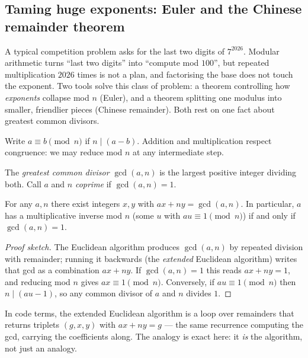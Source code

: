 
\subsection{Taming huge exponents: Euler and the Chinese remainder theorem}

A typical competition problem asks for the last two digits of $7^{2026}$.
Modular arithmetic turns ``last two digits'' into ``compute mod $100$'',
but repeated multiplication $2026$ times is not a plan, and factorising the
base does not touch the exponent. Two tools solve this class of problem:
a theorem controlling how \emph{exponents} collapse mod $n$ (Euler), and a
theorem splitting one modulus into smaller, friendlier pieces (Chinese
remainder). Both rest on one fact about greatest common divisors.

\begin{definition}
Write $a \equiv b \pmod{n}$ if $n \mid (a-b)$. Addition and multiplication
respect congruence: we may reduce mod $n$ at any intermediate step.

The \emph{greatest common divisor} $\gcd(a,n)$ is the largest positive
integer dividing both. Call $a$ and $n$ \emph{coprime} if $\gcd(a,n)=1$.
\end{definition}

\begin{theorem}\label{thm:bezout}
For any $a,n$ there exist integers $x,y$ with $ax+ny=\gcd(a,n)$.
In particular, $a$ has a multiplicative inverse mod $n$ (some $u$ with
$au \equiv 1 \pmod{n}$) if and only if $\gcd(a,n)=1$.
\end{theorem}

\begin{proof}[Proof sketch]
The Euclidean algorithm produces $\gcd(a,n)$ by repeated division with
remainder; running it backwards (the \emph{extended} Euclidean algorithm)
writes that gcd as a combination $ax+ny$. If $\gcd(a,n)=1$ this reads
$ax+ny=1$, and reducing mod $n$ gives $ax \equiv 1 \pmod{n}$.
Conversely, if $au \equiv 1 \pmod{n}$ then $n \mid (au-1)$, so any common
divisor of $a$ and $n$ divides $1$.
\end{proof}

In code terms, the extended Euclidean algorithm is a loop over remainders
that returns triplets $(g,x,y)$ with $ax+ny=g$ --- the same recurrence
computing the gcd, carrying the coefficients along. The analogy is exact
here: it \emph{is} the algorithm, not just an analogy.

